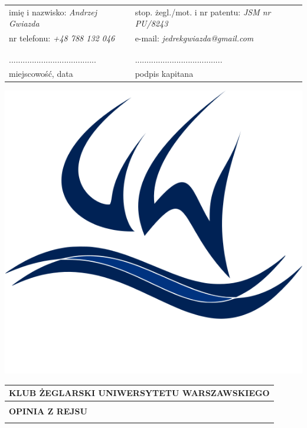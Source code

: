 \documentclass{article}
\begin{document}
\begin{tabularx}{\textwidth}{X X}
imię i nazwisko: \textit{Andrzej Gwiazda} & stop. żegl./mot. i nr patentu: \textit{JSM nr PU/8243}\\
nr telefonu: \textit{+48 788 132 046} & e-mail: \textit{jedrekgwiazda@gmail.com}\\
\\\\
...................................... & ......................................\\
miejscowość, data & podpis kapitana\\
\end{tabularx}
\newpage
\begin{minipage}{0.11\textwidth}
\includegraphics[width=\textwidth]{logo.png}
\end{minipage}
\begin{minipage}{0.89\textwidth}
\begin{tabularx}{\textwidth} { 
  | >{\centering\arraybackslash}X | }
 \hline
 \textbf{KLUB ŻEGLARSKI UNIWERSYTETU WARSZAWSKIEGO} \\
 \hline
 \\
 \textbf{\huge OPINIA Z REJSU} \\
 \\
\hline
\end{tabularx}
\end{minipage}
\end{document}
